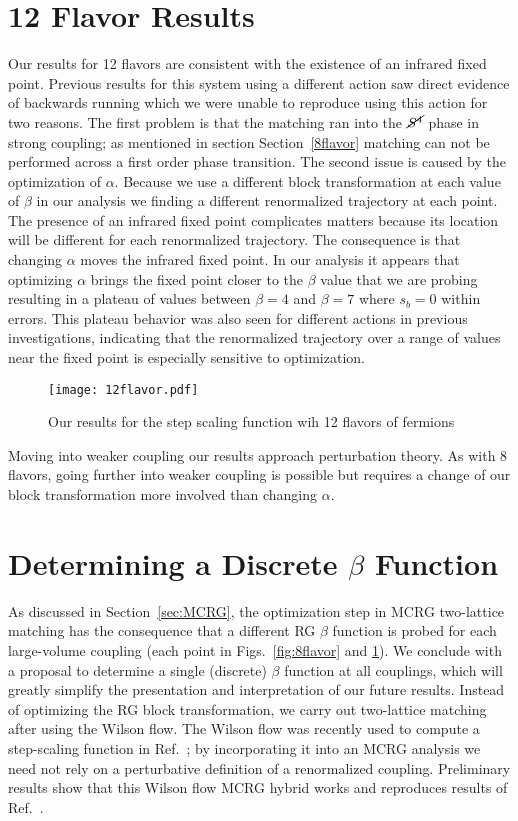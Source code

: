 \documentclass{PoS}
\newcommand{\Sb}{\ensuremath{\cancel{S^4}} }
\newcommand{\refcite}[1]{Ref.~\cite{#1}}
\newcommand{\secref}[1]{Section~\ref{#1}}
\begin{document}
\section{12 Flavor Results}
Our results for 12 flavors are consistent with the existence of an infrared fixed point.
Previous results for this system using a different action saw direct evidence of backwards running which we were unable to reproduce using this action for two reasons.
The first problem is that the matching ran into the \Sb phase in strong coupling; as mentioned in section \secref{8flavor} matching can not be performed across a first order phase transition. 
The second issue is caused by the optimization of $\alpha$.  Because we use a different block transformation at each value of $\beta$ in our analysis we finding a different renormalized trajectory at each point.
The presence of an infrared fixed point complicates matters because its location will be different for each renormalized trajectory.
The consequence is that changing $\alpha$ moves the infrared fixed point.
In our analysis it appears that optimizing $\alpha$ brings the fixed point closer to the $\beta$ value that we are probing resulting in a plateau of values between $\beta=4$ and $\beta=7$ where $s_b=0$ within errors.
This plateau behavior was also seen for different actions in previous investigations, indicating that the renormalized trajectory over a range of values near the fixed point is especially sensitive to optimization.

\begin{figure}[htpb]
  \centering
  \texttt{[image: 12flavor.pdf]}
  \caption{Our results for the step scaling function wih 12 flavors of fermions}
  \label{fig:12flavor}
\end{figure}

Moving into weaker coupling our results approach perturbation theory.  As with 8 flavors, going further into weaker coupling is possible but requires a change of our block transformation more involved than changing $\alpha$.  

\section{Determining a Discrete $\beta$ Function}
As discussed in \secref{sec:MCRG}, the optimization step in MCRG two-lattice matching has the consequence that a different RG $\beta$ function is probed for each large-volume coupling (each point in Figs.~\ref{fig:8flavor} and \ref{fig:12flavor}).
We conclude with a proposal to determine a single (discrete) $\beta$ function at all couplings, which will greatly simplify the presentation and interpretation of our future results.
Instead of optimizing the RG block transformation, we carry out two-lattice matching after using the Wilson flow.
The Wilson flow was recently used to compute a step-scaling function in \refcite{Fodor:2012td}; by incorporating it into an MCRG analysis we need not rely on a perturbative definition of a renormalized coupling.
Preliminary results show that this Wilson flow MCRG hybrid works and reproduces results of \refcite{Fodor:2012td}.
\end{document}
